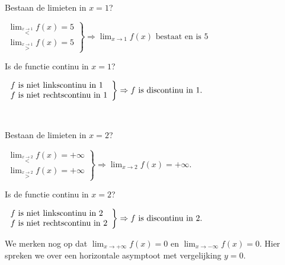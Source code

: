 \begin{voorbeeld}
	\ \\

Bestaan de limieten in $x=1$?

\begin{math}
\left. \begin{array}{l}
\lim_{\overset{x\rightarrow1}{<}}f(x)=5 \\
 \lim_{\overset{x\rightarrow1}{>}}f(x)=5
\end{array}
\right\}
\Rightarrow \lim_{x\to1}f(x) \text{ bestaat en is } 5
\end{math}

Is de functie continu in $x=1$?

\begin{math}
\centering
\left. \begin{array}{l}
f \text{ is niet linkscontinu in }1\\
f \text{ is niet rechtscontinu in }1
\end{array}
\right\}
\Rightarrow f \text{ is discontinu in }1.
\end{math}


\end{voorbeeld}


\begin{voorbeeld}
	\ \\

Bestaan de limieten in $x=2$?

\begin{math}
\left. \begin{array}{l}
\lim_{\overset{x\rightarrow2}{<}}f(x)=+\infty \\
 \lim_{\overset{x\rightarrow2}{>}}f(x)=+\infty
\end{array}
\right\}
\Rightarrow \lim_{x\to2}f(x)=+\infty.
\end{math}

Is de functie continu in $x=2$?

\begin{math}
\centering
\left. \begin{array}{l}
f \text{ is niet linkscontinu in }2\\
f \text{ is niet rechtscontinu in }2
\end{array}
\right\}
\Rightarrow f \text{ is discontinu in }2.
\end{math}

We merken nog op dat $\lim_{x\rightarrow+\infty}f(x)=0$ en $\lim_{x\rightarrow-\infty}f(x)=0$. Hier spreken we over een horizontale asymptoot met vergelijking $y=0$.

\end{voorbeeld}

